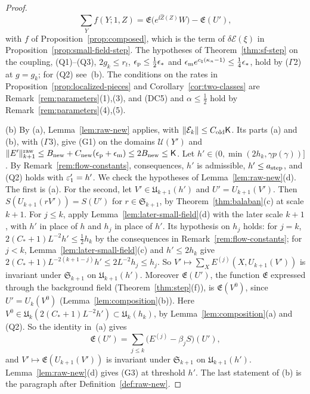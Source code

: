\begin{proof}
\[
\sum_Yf(Y;1,Z)=\mathfrak E\big(e^{\ii\hat Z(Z)}W\big)-\mathfrak E(U'),
\]
with $f$ of Proposition~\ref{prop:composed}, which is the term of $\delta\mathcal E(\xi)$ in Proposition~\ref{prop:small-field-step}. The hypotheses of Theorem~\ref{thm:sf-step} on the coupling, (Q1)--(Q3), $2g_k\le r_t$, $\epsilon_{\rm p}\le\frac12\epsilon_*$ and $\epsilon_{\rm m}e^{c_\natural(\kappa_n-1)}\le\frac14\epsilon_*$, hold by ($\Gamma$2) at $g=g_k$; for (Q2) see~(b). The conditions on the rates in Proposition~\ref{prop:localized-pieces} and Corollary~\ref{cor:two-classes} are Remark~\ref{rem:parameters}(1),(3), and (DC5) and $\alpha\le\frac12$ hold by Remark~\ref{rem:parameters}(4),(5).

(b) By (a), Lemma~\ref{lem:raw-new} applies, with $\|\mathcal E_k\|\le C_{\rm old}\mathsf K$. Its parts (a) and (b), with ($\Gamma$3), give (G1) on the domains $\mathcal U(Y')$ and $\|E'\|^{\rm raw}_{k+1}\le B_{\rm new}+C_{\rm new}(\epsilon_{\rm p}+\epsilon_{\rm m})\le2B_{\rm new}\le\mathsf K$. Let $h'\in(0,\min(2h_k,\gamma p(\gamma))]$. By Remark~\ref{rem:flow-constants}, consequences, $h'$ is admissible, $h'\le a_{\rm step}$, and (Q2) holds with $\varepsilon'_1=h'$. We check the hypotheses of Lemma~\ref{lem:raw-new}(d). The first is (a). For the second, let $V'\in\mathfrak U_{k+1}(h')$ and $U'=U_{k+1}(V')$. Then $S(U_{k+1}(rV'))=S(U')$ for $r\in\mathfrak S_{k+1}$, by Theorem~\ref{thm:balaban}(c) at scale $k+1$. For $j\le k$, apply Lemma~\ref{lem:later-small-field}(d) with the later scale $k+1$, with $h'$ in place of $h$ and $h_j$ in place of $h'$. Its hypothesis on $h_j$ holds: for $j=k$, $2(C_*+1)L^{-2}h'\le\frac12h_k$ by the consequences in Remark~\ref{rem:flow-constants}; for $j<k$, Lemma~\ref{lem:later-small-field}(c) and $h'\le2h_k$ give $2(C_*+1)L^{-2(k+1-j)}h'\le2L^{-2}h_j\le h_j$. So $V'\mapsto\sum_XE^{(j)}(X,U_{k+1}(V'))$ is invariant under $\mathfrak S_{k+1}$ on $\mathfrak U_{k+1}(h')$. Moreover $\mathfrak E(U')$, the function $\mathfrak E$ expressed through the background field (Theorem~\ref{thm:step}(f)), is $\mathfrak E(V^0)$, since $U'=U_k(V^0)$ (Lemma~\ref{lem:composition}(b)). Here $V^0\in\mathfrak U_k(2(C_*+1)L^{-2}h')\subset\mathfrak U_k(h_k)$, by Lemma~\ref{lem:composition}(a) and (Q2). So the identity in~(a) gives
\[
\mathfrak E(U')=\sum_{j\le k}\big(E^{(j)}-\beta_jS\big)(U'),
\]
and $V'\mapsto\mathfrak E(U_{k+1}(V'))$ is invariant under $\mathfrak S_{k+1}$ on $\mathfrak U_{k+1}(h')$. Lemma~\ref{lem:raw-new}(d) gives (G3) at threshold $h'$. The last statement of (b) is the paragraph after Definition~\ref{def:raw-new}.


\end{proof}
